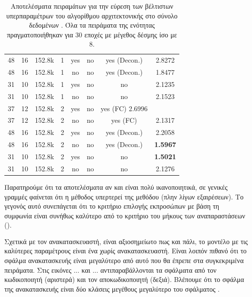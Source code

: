 \begin{table}[h]
\begin{center}
{\begin{tabular}{c c c c c c c c}
            48 & 16 & 152.8k & 1 & yes & no & yes (Decon.) & 2.8272 \\%
            48 & 16 & 152.8k & 1 & no & no & yes (Decon.) & 1.8477 \\%

            31 & 10 & 152.8k & 1 & yes & no & no & 2.1235 \\%
            31 & 10 & 152.8k & 1 & no & no & no & 2.1523 \\%

            37 & 12 & 152.8k & 2 & yes & no & yes (FC) 2.6996 \\ %
            37 & 12 & 152.8k & 2 & no & no & yes (FC) & 2.1317 \\%

            48 & 16 & 152.8k & 2 & yes & no & yes (Decon.) & 2.2058 \\ %
            48 & 16 & 152.8k & 2 & no & no & yes (Decon.) & \textbf{1.5967}\\ %

            31 & 10 & 152.8k & 2 & yes & no & no & \textbf{1.5021}\\%
            31 & 10 & 152.8k & 2 & no & no & no & 2.1276\\%

            \bottomrule
        \end{tabular}
        }
    \end{center}
    \caption[]{\label{tab:method_3_hyper_tuning_RoWLS}Αποτελέσματα πειραμάτων για την εύρεση των βέλτιστων υπερπαραμέτρων του αλγορίθμου  αρχιτεκτονικής  στο σύνολο δεδομένων . Όλα τα πειράματα της ενότητας πραγματοποιήθηκαν για 30 εποχές με μέγεθος δέσμης ίσο με 8.} 
\end{table}
Παρατηρούμε ότι τα αποτελέσματα αν και είναι πολύ ικανοποιητικά, σε γενικές γραμμές φαίνεται ότι η μέθοδος  υπερτερεί της μεθόδου  (πλην λίγων εξαιρέσεων). Το γεγονός αυτό συνεπάγεται ότι το κριτήριο επιλογής εκπροσώπων με βάση τη συμφωνία είναι συνήθως καλύτερο από το κριτήριο του μήκους των αναπαραστάσεων ().\par

Σχετικά με τον ανακατασκευαστή, είναι αξιοσημείωτο πως και πάλι, το μοντέλο με τις καλύτερες παραμέτρους είναι ένα χωρίς ανακατασκευαστή. Είναι λοιπόν πιθανό ότι το σφάλμα ανακατασκευής είναι μεγαλύτερο από αυτό που θα έπρεπε στα συγκεκριμένα πειράματα. Στις εικόνες ... και ... αντιπαραβάλλονται τα σφάλματα από τον κωδικοποιητή (αριστερά) και τον αποκωδικοποιητή (δεξιά). Βλέπουμε ότι το σφάλμα της ανακατασκευής είναι δύο κλάσεις μεγέθους μεγαλύτερο του σφάλματος .

